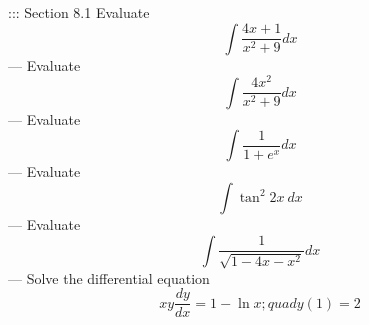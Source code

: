 ::: Section 8.1
Evaluate
\[\int{\frac{4x+1}{x^2+9}}dx\]
---
Evaluate
\[\int{\frac{4x^2}{x^2+9}}dx\]
---
Evaluate
\[\int{\frac{1}{1+e^x}}dx\]
---
Evaluate
\[\int\tan^2 2x\ dx\]
---
Evaluate
\[\int\frac{1}{\sqrt{1-4x-x^2}}dx\]
---
Solve the differential equation
\[xy\frac{dy}{dx}=1-\ln x;quad y(1)=2\]


